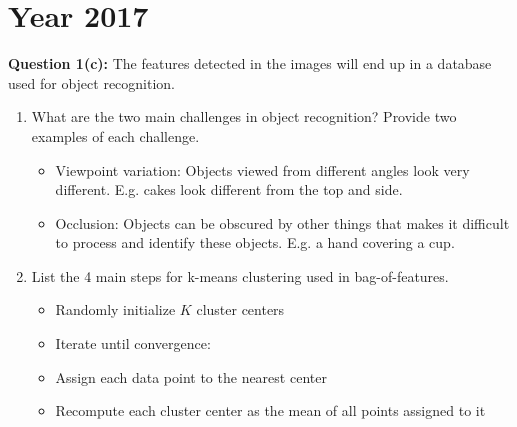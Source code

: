 \documentclass{article}
\begin{document}
    \section{Year 2017}
    \textbf{Question 1(c):} The features detected in the images will end up in a
    database used for object recognition.
    \begin{enumerate}
        \item What are the two main challenges in object recognition? Provide two examples of each challenge.
        
        \begin{itemize}
            \item Viewpoint variation: Objects viewed from different angles look
            very different. E.g. cakes look different from the top and side. 

            \item Occlusion: Objects can be obscured by other things that makes
            it difficult to process and identify these objects. E.g. a hand
            covering a cup.
        \end{itemize}

        \item List the 4 main steps for k-means clustering used in bag-of-features.
        \begin{itemize}
            \item Randomly initialize $K$ cluster centers
            \item Iterate until convergence:
            \item Assign each data point to the nearest center
            \item Recompute each cluster center as the mean of all points
            assigned to it
        \end{itemize}
    \end{enumerate}
\end{document}
